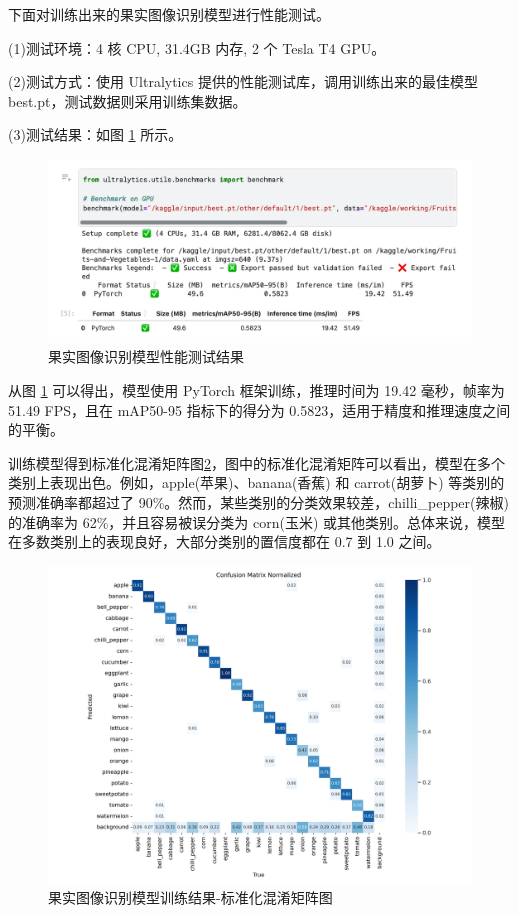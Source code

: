 下面对训练出来的果实图像识别模型进行性能测试。

(1)测试环境：4 核 CPU, 31.4GB 内存, 2 个 Tesla T4 GPU。

(2)测试方式：使用 Ultralytics 提供的性能测试库，调用训练出来的最佳模型 best.pt，测试数据则采用训练集数据。

(3)测试结果：如图 \ref{fig:model-benchmark} 所示。

\begin{figure}[H]
    \centering
    \includegraphics[width=0.95\linewidth]{../source/aws-img/yolov8/benchmark.png}
    \caption{果实图像识别模型性能测试结果}
    \label{fig:model-benchmark}
\end{figure}

从图 \ref{fig:model-benchmark} 可以得出，模型使用 PyTorch 框架训练，推理时间为 19.42 毫秒，帧率为 51.49 FPS，且在 mAP50-95 指标下的得分为 0.5823，适用于精度和推理速度之间的平衡。

训练模型得到标准化混淆矩阵图\ref{fig:confusion_matrix_normalized}，图中的标准化混淆矩阵可以看出，模型在多个类别上表现出色。例如，apple(苹果)、banana(香蕉) 和 carrot(胡萝卜) 等类别的预测准确率都超过了 90\%。然而，某些类别的分类效果较差，chilli\_pepper(辣椒)的准确率为 62\%，并且容易被误分类为 corn(玉米) 或其他类别。总体来说，模型在多数类别上的表现良好，大部分类别的置信度都在 0.7 到 1.0 之间。

\begin{figure}
    \centering
    \includegraphics[width=0.95\linewidth]{../source/aws-img/yolov8/out/image/confusion_matrix_normalized.png}
    \caption{果实图像识别模型训练结果-标准化混淆矩阵图}
    \label{fig:confusion_matrix_normalized}
\end{figure}

